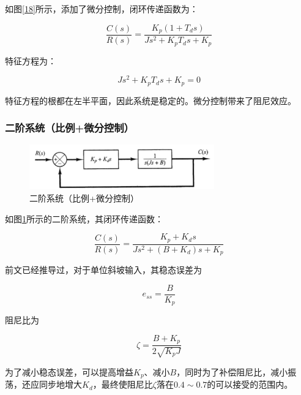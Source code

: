 如图\ref{18}所示，添加了微分控制，闭环传递函数为：

\begin{equation*}
\frac{C(s)}{R(s)}=\frac{K_p(1+T_ds)}{Js^2+K_pT_ds+K_p}
\end{equation*}

特征方程为：

\begin{equation*}
Js^2+K_pT_ds+K_p=0
\end{equation*}

特征方程的根都在左半平面，因此系统是稳定的。微分控制带来了阻尼效应。

\subsubsection{二阶系统（比例+微分控制）}

\begin{figure}[!ht]
	\centering
	\includegraphics[width=8cm]{figures/19.png}
	\caption{二阶系统（比例+微分控制）}
	\label{19}
\end{figure}

如图\ref{19}所示的二阶系统，其闭环传递函数：

\begin{equation*}
\frac{C(s)}{R(s)}=\frac{K_p+K_ds}{Js^2+(B+K_d)s+K_p}
\end{equation*}

前文已经推导过，对于单位斜坡输入，其稳态误差为

\begin{equation*}
e_{ss}=\frac{B}{K_p}
\end{equation*}

阻尼比为

\begin{equation*}
\zeta=\frac{B+K_p}{2\sqrt{K_pJ}}
\end{equation*}

为了减小稳态误差，可以提高增益$K_p$、减小$B$，同时为了补偿阻尼比，减小振荡，还应同步地增大$K_d$，最终使阻尼比$\zeta$落在$0.4\sim0.7$的可以接受的范围内。




